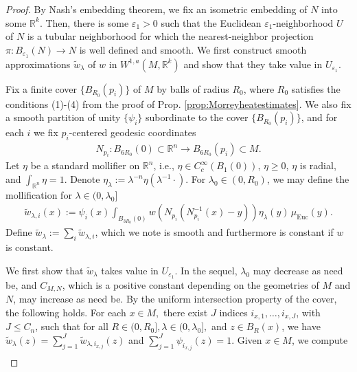 \documentclass[12pt]{amsart}
\renewcommand{\1}{{\mathbf 1}}
\newcommand{\R}{{\mathbb R}}
\theoremstyle{others}
\numberwithin{equation}{section}
\begin{document}
\begin{proof}
    By Nash's embedding theorem, we fix an isometric embedding of \(N\) into some \(\R^k\). Then, there is some \(\varepsilon_1 > 0\) such that the Euclidean \(\varepsilon_1\)-neighborhood \(U\) of \(N\) is a tubular neighborhood for which the nearest-neighbor projection \(\pi:B_{\varepsilon_1}(N) \to N\) is well defined and smooth. We first construct smooth approximations \(\tilde{w}_\lambda\) of \(w\) in \(W^{1, a}(M, \R^k)\) and show that they take value in \(U_{\varepsilon_1}\). \par
    Fix a finite cover \(\{B_{R_0}(p_i)\}\) of \(M\) by balls of radius \(R_0\), where \(R_0\) satisfies the conditions (1)-(4) from the proof of Prop. \ref{prop:Morreyheatestimates}. We also fix a smooth partition of unity \(\{\psi_i\}\) subordinate to the cover \(\{B_{R_0}(p_i)\}\), and for each \(i\) we fix \(p_i\)-centered geodesic coordinates
    \begin{align*}
        N_{p_i} : B_{6R_0}(0)\subset \R^n \to B_{6R_0}(p_i) \subset M.
    \end{align*} Let \(\eta\) be a standard mollifier on \(\R^n\), i.e., \(\eta \in C_c^\infty(B_1(0))\), \(\eta \geq 0\), \(\eta\) is radial, and \(\int_{\R^n} \eta = 1\). Denote \(\eta_\lambda := \lambda^{-n} \eta(\lambda^{-1} \cdot)\). For \(\lambda_0 \in (0, R_0)\), we may define the mollification for \(\lambda \in (0, \lambda_0]\)
    \begin{align*}
        \tilde{w}_{\lambda, i}(x) := \psi_i(x)\int_{B_{3R_0}(0)} w(N_{p_i}(N_{p_i}^{-1}(x)-y))\eta_\lambda(y) \, \mu_{\text{Euc}}(y).
    \end{align*}  Define \(\tilde{w}_\lambda := \sum_i \tilde{w}_{\lambda, i}\), which we note is smooth and furthermore is constant if \(w\) is constant. \par
    We first show that \(\tilde{w}_\lambda\) takes value in \(U_{\varepsilon_1}\). In the sequel, \(\lambda_0\) may decrease as need be, and \(C_{M, N}\), which is a positive constant depending on the geometries of \(M\) and \(N\), may increase as need be. By the uniform intersection property of the cover, the following holds. For each \(x \in M ,\) there exist \(J\) indices \(i_{x, 1}, \dots, i_{x, J}\), with \(J \leq C_n\), such that for all  \(R \in (0, R_0], \lambda \in (0, \lambda_0],\) and \(z \in B_R(x)\), we have \(\tilde{w}_\lambda(z) = \sum_{j = 1}^J \tilde{w}_{\lambda, i_{x, j}}(z)\) and \(\sum_{j = 1}^J \psi_{i_{x, j}}(z) = 1\). Given \(x \in M\), we compute
    \begin{align*}

\end{align*}
\end{proof}
\end{document}
